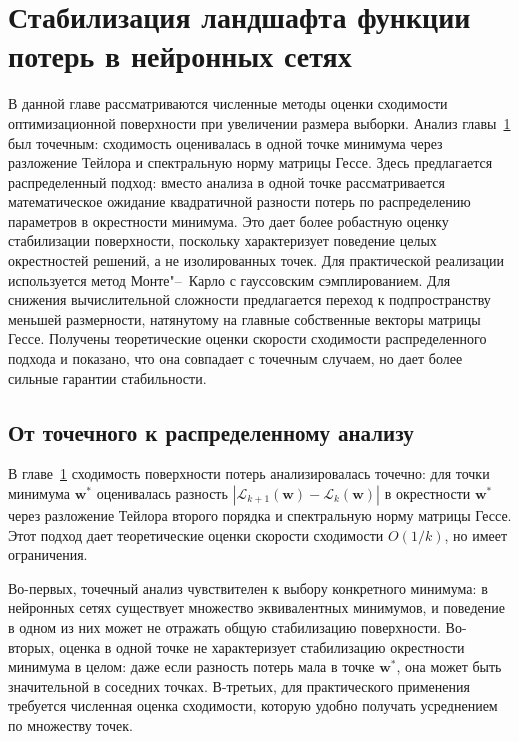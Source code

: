 \chapter{Стабилизация ландшафта функции потерь в нейронных сетях}\label{ch:landscapes}

В данной главе рассматриваются численные методы оценки сходимости оптимизационной поверхности при увеличении размера выборки. Анализ главы~\ref{ch:landscapes} был точечным: сходимость оценивалась в одной точке минимума через разложение Тейлора и спектральную норму матрицы Гессе. Здесь предлагается распределенный подход: вместо анализа в одной точке рассматривается математическое ожидание квадратичной разности потерь по распределению параметров в окрестности минимума. Это дает более робастную оценку стабилизации поверхности, поскольку характеризует поведение целых окрестностей решений, а не изолированных точек. Для практической реализации используется метод Монте"--~Карло с гауссовским сэмплированием. Для снижения вычислительной сложности предлагается переход к подпространству меньшей размерности, натянутому на главные собственные векторы матрицы Гессе. Получены теоретические оценки скорости сходимости распределенного подхода и показано, что она совпадает с точечным случаем, но дает более сильные гарантии стабильности.

\section{От точечного к распределенному анализу}

В главе~\ref{ch:landscapes} сходимость поверхности потерь анализировалась точечно: для точки минимума $\mathbf{w}^*$ оценивалась разность $|\mathcal{L}_{k+1}(\mathbf{w}) - \mathcal{L}_k(\mathbf{w})|$ в окрестности $\mathbf{w}^*$ через разложение Тейлора второго порядка и спектральную норму матрицы Гессе. Этот подход дает теоретические оценки скорости сходимости $O(1/k)$, но имеет ограничения.

Во-первых, точечный анализ чувствителен к выбору конкретного минимума: в нейронных сетях существует множество эквивалентных минимумов, и поведение в одном из них может не отражать общую стабилизацию поверхности. Во-вторых, оценка в одной точке не характеризует стабилизацию окрестности минимума в целом: даже если разность потерь мала в точке $\mathbf{w}^*$, она может быть значительной в соседних точках. В-третьих, для практического применения требуется численная оценка сходимости, которую удобно получать усреднением по множеству точек.

